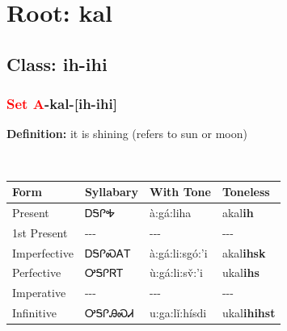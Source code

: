 \needspace{4in}
\section*{Root: kal}
\nopagebreak
{}
\needspace{3in}
\subsection*{Class: ih-ihi}
\nopagebreak
\needspace{2in}
\subsubsection*{\textcolor{Red}{Set A}{-}\textbf{kal}{-}[ih-ihi]}
\nopagebreak
\textbf{Definition: } it is shining (refers to sun or moon)
\\[0.5em]
\begin{tabularx}{\textwidth}{l X X X}%
\toprule%
\textbf{Form}&\textbf{Syllabary}&\textbf{With Tone}&\textbf{Toneless}\\%
\midrule%
Present&ᎠᎦᎵᎭ&à:gá:liha&akal\textbf{ih}\\%
1st Present&{-}{-}{-}&{-}{-}{-}&{-}{-}{-}\\%
Imperfective&ᎠᎦᎵᏍᎪᎢ&à:gá:li:sgó:’i&akal\textbf{ihsk}\\%
Perfective&ᎤᎦᎵᏒᎢ&ù:gá:li:sv̌:’i&ukal\textbf{ihs}\\%
Imperative&{-}{-}{-}&{-}{-}{-}&{-}{-}{-}\\%
Infinitive&ᎤᎦᎵᎯᏍᏗ&u:ga:lǐ:hísdi&ukal\textbf{ihihst}\\%
\bottomrule%
\end{tabularx}
\\[1em]